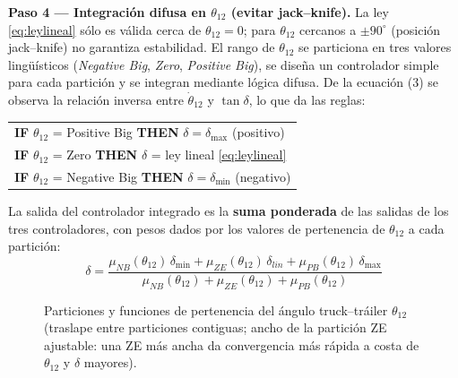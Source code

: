 \documentclass[11pt,a4paper]{article}
\newcommand{\grados}{^{\circ}}
\begin{document}
\textbf{Paso 4 — Integración difusa en $\theta_{12}$ (evitar jack--knife).} La ley \eqref{eq:leylineal} sólo es válida cerca de $\theta_{12}=0$; para $\theta_{12}$ cercanos a $\pm 90\grados$ (posición jack--knife) no garantiza estabilidad. El rango de $\theta_{12}$ se particiona en tres valores lingüísticos (\emph{Negative Big}, \emph{Zero}, \emph{Positive Big}), se diseña un controlador simple para cada partición y se integran mediante lógica difusa. De la ecuación (3) se observa la relación inversa entre $\dot\theta_{12}$ y $\tan\delta$, lo que da las reglas:
\begin{center}
\begin{tabular}{l}
\textbf{IF } $\theta_{12}$ = Positive Big \textbf{ THEN } $\delta=\delta_{\max}$ (positivo)\\
\textbf{IF } $\theta_{12}$ = Zero \textbf{ THEN } $\delta$ = ley lineal \eqref{eq:leylineal}\\
\textbf{IF } $\theta_{12}$ = Negative Big \textbf{ THEN } $\delta=\delta_{\min}$ (negativo)
\end{tabular}
\end{center}
La salida del controlador integrado es la \textbf{suma ponderada} de las salidas de los tres controladores, con pesos dados por los valores de pertenencia de $\theta_{12}$ a cada partición:
\begin{equation}
\delta = \frac{\mu_{NB}(\theta_{12})\,\delta_{\min} + \mu_{ZE}(\theta_{12})\,\delta_{lin} + \mu_{PB}(\theta_{12})\,\delta_{\max}}
{\mu_{NB}(\theta_{12}) + \mu_{ZE}(\theta_{12}) + \mu_{PB}(\theta_{12})}
\label{eq:sumapond}
\end{equation}

\begin{figure}[h]
\centering
{}
\caption{Particiones y funciones de pertenencia del ángulo truck--tráiler $\theta_{12}$ (traslape entre particiones contiguas; ancho de la partición ZE ajustable: una ZE más ancha da convergencia más rápida a costa de $\theta_{12}$ y $\delta$ mayores).}
\end{figure}
\end{document}

